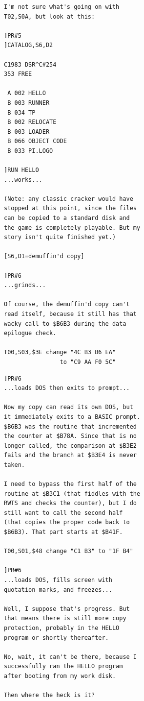 \documentclass{article}
\begin{document}
\begin{verbatim}
I'm not sure what's going on with
T02,S0A, but look at this:

]PR#5
]CATALOG,S6,D2

C1983 DSR^C#254
353 FREE

 A 002 HELLO
 B 003 RUNNER
 B 034 TP
 B 002 RELOCATE
 B 003 LOADER
 B 066 OBJECT CODE
 B 033 PI.LOGO

]RUN HELLO
...works...

(Note: any classic cracker would have
stopped at this point, since the files
can be copied to a standard disk and
the game is completely playable. But my
story isn't quite finished yet.)

[S6,D1=demuffin'd copy]

]PR#6
...grinds...

Of course, the demuffin'd copy can't
read itself, because it still has that
wacky call to $B6B3 during the data
epilogue check.

T00,S03,$3E change "4C B3 B6 EA"
                to "C9 AA F0 5C"
\end{verbatim}

\newpage

\begin{verbatim}
]PR#6
...loads DOS then exits to prompt...

Now my copy can read its own DOS, but
it immediately exits to a BASIC prompt.
$B6B3 was the routine that incremented
the counter at $B78A. Since that is no
longer called, the comparison at $B3E2
fails and the branch at $B3E4 is never
taken.

I need to bypass the first half of the
routine at $B3C1 (that fiddles with the
RWTS and checks the counter), but I do
still want to call the second half
(that copies the proper code back to
$B6B3). That part starts at $B41F.

T00,S01,$48 change "C1 B3" to "1F B4"

]PR#6
...loads DOS, fills screen with
quotation marks, and freezes...

Well, I suppose that's progress. But
that means there is still more copy
protection, probably in the HELLO
program or shortly thereafter.

No, wait, it can't be there, because I
successfully ran the HELLO program
after booting from my work disk.

Then where the heck is it?
\end{verbatim}

\newpage
\end{document}
